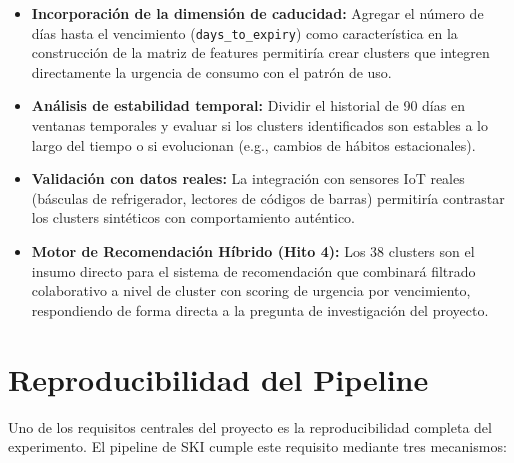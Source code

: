\documentclass[12pt,a4paper]{article}
\newcommand{\code}[1]{\texttt{\small #1}}
\begin{document}
\begin{itemize}
    \item \textbf{Incorporación de la dimensión de caducidad:} Agregar el número de días hasta el vencimiento (\code{days\_to\_expiry}) como característica en la construcción de la matriz de features permitiría crear clusters que integren directamente la urgencia de consumo con el patrón de uso.
    \item \textbf{Análisis de estabilidad temporal:} Dividir el historial de 90 días en ventanas temporales y evaluar si los clusters identificados son estables a lo largo del tiempo o si evolucionan (e.g., cambios de hábitos estacionales).
    \item \textbf{Validación con datos reales:} La integración con sensores IoT reales (básculas de refrigerador, lectores de códigos de barras) permitiría contrastar los clusters sintéticos con comportamiento auténtico.
    \item \textbf{Motor de Recomendación Híbrido (Hito 4):} Los 38 clusters son el insumo directo para el sistema de recomendación que combinará filtrado colaborativo a nivel de cluster con scoring de urgencia por vencimiento, respondiendo de forma directa a la pregunta de investigación del proyecto.
\end{itemize}

\section{Reproducibilidad del Pipeline}

Uno de los requisitos centrales del proyecto es la reproducibilidad completa del experimento. El pipeline de SKI cumple este requisito mediante tres mecanismos:
\end{document}
